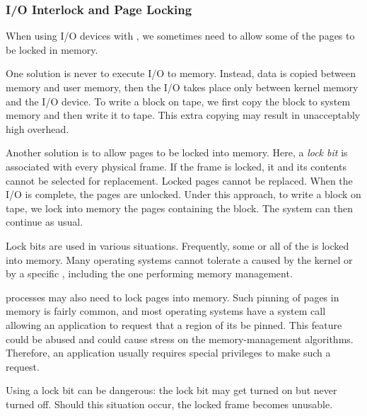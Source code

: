 \subsubsection{I/O Interlock and Page Locking}\label{IO:subsubsec_Interlock_Page_Locking}
When using I/O devices with , we sometimes need to allow some of the pages to be locked in memory.

One solution is never to execute I/O to  memory.
Instead, data is copied between  memory and user memory, then the I/O takes place only between kernel memory and the I/O device.
To write a block on tape, we first copy the block to system memory and then write it to tape.
This extra copying may result in unacceptably high overhead.

Another solution is to allow pages to be locked into memory.
Here, a \emph{lock bit} is associated with every physical frame.
If the frame is locked, it and its contents cannot be selected for replacement.
Locked pages cannot be replaced.
When the I/O is complete, the pages are unlocked.
Under this approach, to write a block on tape, we lock into memory the pages containing the block.
The system can then continue as usual.

Lock bits are used in various situations.
Frequently, some or all of the   is locked into memory.
Many operating systems cannot tolerate a  caused by the kernel or by a specific , including the one performing memory management.

 processes may also need to lock pages into memory.
Such pinning of pages in memory is fairly common, and most operating systems have a system call allowing an application to request that a region of its  be pinned.
This feature could be abused and could cause stress on the memory-management algorithms.
Therefore, an application usually requires special privileges to make such a request.

Using a lock bit can be dangerous: the lock bit may get turned on but never turned off.
Should this situation occur, the locked frame becomes unusable.

